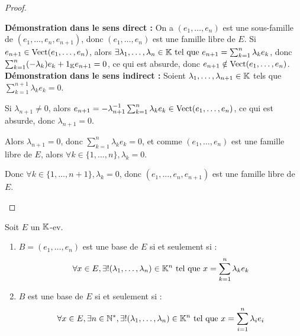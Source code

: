 \documentclass[12pt,a4paper]{report}
\begin{document}
\begin{proof}
    \begin{outline}
        \1 \textbf{Démonstration dans le sens direct :}
            \2 On a $(e_1,\dots,e_n)$ est une sous-famille de $(e_1,\dots,e_n,e_{n+1})$, donc $(e_1,\dots,e_n)$ est une famille libre de $E$.
            \2 Si $e_{n+1} \in \mathrm{Vect}(e_1,\dots,e_n)$, alors $\exists \lambda_1,\dots,\lambda_n \in \mathbb{K} \text{ tel que } e_{n+1} = \sum_{k=1}^n \lambda_k e_k$, donc $\sum_{k=1}^n (-\lambda_k) e_k + 1_{\mathbb{K}} e_{n+1} = 0$, ce qui est absurde, donc $e_{n+1} \notin \mathrm{Vect}(e_1,\dots,e_n)$.
        \1 \textbf{Démonstration dans le sens indirect :}
            \2 Soient $\lambda_1,\dots,\lambda_{n+1} \in \mathbb{K}$ tels que $\sum_{k=1}^{n+1} \lambda_k e_k = 0$.

            \2 Si $\lambda_{n+1} \ne 0$, alors $e_{n+1} = -\lambda_{n+1}^{-1} \sum_{k=1}^n \lambda_k e_k \in \mathrm{Vect}(e_1,\dots,e_n)$, ce qui est absurde, donc $\lambda_{n+1} = 0$.

            \2 Alors $\lambda_{n+1} = 0$, donc $\sum_{k=1}^n \lambda_k e_k = 0$, et comme $(e_1,\dots,e_n)$ est une famille libre de $E$, alors $\forall k \in \{1,\dots,n\}, \lambda_k = 0$.

            \2 Donc $\forall k \in \{1,\dots,n+1\}, \lambda_k = 0$, donc $(e_1,\dots,e_n,e_{n+1})$ est une famille libre de $E$.
    \end{outline}
\end{proof}

\begin{property}
    Soit $E$ un $\mathbb{K}$-ev.
    \begin{enumerate}
        \item $B = (e_1,\dots,e_n)$ est une base de $E$ si et seulement si : 
        $$\forall x \in E, \exists ! (\lambda_1,\dots,\lambda_n) \in \mathbb{K}^n \text{ tel que } x = \sum_{k=1}^n \lambda_k e_k$$
        \item $B$ est une base de $E$ si et seulement si : 
        $$\forall x \in E, \exists n\in \mathbb{N}^*, \exists ! (\lambda_1,\dots,\lambda_n) \in \mathbb{K}^n \text{ tel que } x= \sum_{i=1}^{n}\lambda_i e_i$$
    \end{enumerate}
\end{property}
\end{document}
